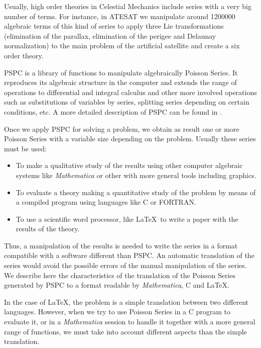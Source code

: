 Usually, high order theories in Celestial Mechanics include
series with a very big number of terms. For instance, in ATESAT we manipulate
around 1200000 algebraic terms of this kind of series to apply three Lie
transformations (elimination of the parallax, elimination of the perigee and
Delaunay normalization) to the main problem of the artificial satellite and
create a six order theory.
\par\medskip

PSPC is a library of functions to manipulate
algebraically Poisson Series. It reproduces its algebraic structure in the
computer and extends the range of operations to differential and integral
calculus and other more involved operations such as substitutions of variables by
series, splitting series depending on certain conditions, etc. A more detailed
description of PSPC can be found in \cite{aba93}.
\par\medskip

Once we apply PSPC for solving a problem, we
obtain as  result one or more Poisson Series with a variable size depending on
the problem. Usually these series must be used:
\begin{itemize}

\item To make a qualitative study of the results
using other computer algebraic systems like {\sl Mathematica} or other with more
general tools including graphics.

\item To evaluate a theory making a quantitative study
of the problem by means of a compiled program using languages like C or FORTRAN.

\item To use a scientific word processor, like \LaTeX\, to write a  paper with the
results of  the theory.
\end{itemize}

Thus, a manipulation of the results
is needed to write the series in a format compatible with a software different than
PSPC. An automatic translation of the series would avoid the possible errors of the
manual manipulation of the series.  We describe here the characteristics of the
translation of the Poisson Series generated by PSPC to a format readable by {\sl
Mathematica}, C and \LaTeX.
\par\medskip

In the case of \LaTeX, the problem is a simple
translation between two different languages. However, when we try to use Poisson
Series in a C program to evaluate it, or in a {\sl Mathematica} session to handle it
together with a more general range of functions, we must take into account
different aspects than the simple translation.
\par\medskip

